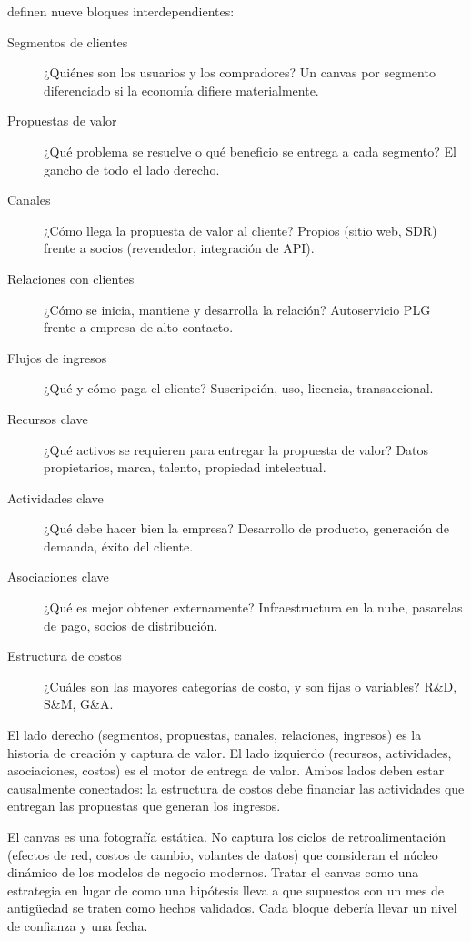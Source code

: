 \textcite{osterwalder2010} definen nueve bloques interdependientes:
\begin{description}
  \item[Segmentos de clientes] ¿Quiénes son los usuarios y los compradores? Un canvas por segmento diferenciado si la economía difiere materialmente.
  \item[Propuestas de valor] ¿Qué problema se resuelve o qué beneficio se entrega a cada segmento? El gancho de todo el lado derecho.
  \item[Canales] ¿Cómo llega la propuesta de valor al cliente? Propios (sitio web, SDR) frente a socios (revendedor, integración de API).
  \item[Relaciones con clientes] ¿Cómo se inicia, mantiene y desarrolla la relación? Autoservicio PLG frente a empresa de alto contacto.
  \item[Flujos de ingresos] ¿Qué y cómo paga el cliente? Suscripción, uso, licencia, transaccional.
  \item[Recursos clave] ¿Qué activos se requieren para entregar la propuesta de valor? Datos propietarios, marca, talento, propiedad intelectual.
  \item[Actividades clave] ¿Qué debe hacer bien la empresa? Desarrollo de producto, generación de demanda, éxito del cliente.
  \item[Asociaciones clave] ¿Qué es mejor obtener externamente? Infraestructura en la nube, pasarelas de pago, socios de distribución.
  \item[Estructura de costos] ¿Cuáles son las mayores categorías de costo, y son fijas o variables? R\&D, S\&M, G\&A.
\end{description}
El lado derecho (segmentos, propuestas, canales, relaciones, ingresos) es la historia de creación y captura de valor. El lado izquierdo (recursos, actividades, asociaciones, costos) es el motor de entrega de valor. Ambos lados deben estar causalmente conectados: la estructura de costos debe financiar las actividades que entregan las propuestas que generan los ingresos.

El canvas es una fotografía estática. No captura los ciclos de retroalimentación (efectos de red, costos de cambio, volantes de datos) que \textcite{zott2011business} consideran el núcleo dinámico de los modelos de negocio modernos. Tratar el canvas como una estrategia en lugar de como una hipótesis lleva a que supuestos con un mes de antigüedad se traten como hechos validados. Cada bloque debería llevar un nivel de confianza y una fecha.

